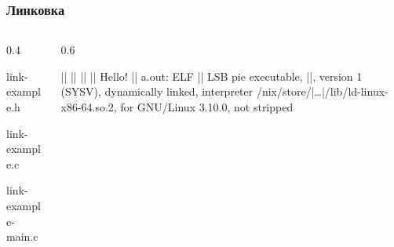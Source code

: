 \documentclass[compress, 8pt, aspectratio=169]{beamer}
\begin{document}
\begin{frame}[fragile]

    \frametitle{Линковка}

    \begin{columns}[T]

        \begin{column}{0.4\textwidth}

                {link-example.h}

                {link-example.c}

                {link-example-main.c}

        \end{column}

        \begin{column}{0.6\textwidth}

            \begin{terminalwindow}[||]
||
||
||
||
Hello!
||
a.out: ELF || LSB pie executable,
||, version 1 (SYSV), dynamically linked,
interpreter /nix/store/|\dots|/lib/ld-linux-x86-64.so.2,
for GNU/Linux 3.10.0, not stripped
            \end{terminalwindow}

        \end{column}

    \end{columns}

\end{frame}

\end{document}
